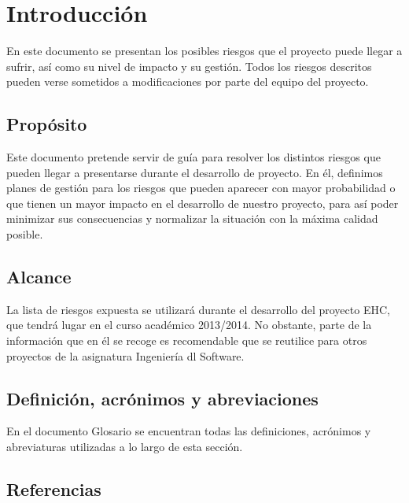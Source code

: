 \chapter{Introducción}
En este documento se presentan los posibles riesgos que el proyecto puede llegar a sufrir, así como su nivel de impacto y su gestión. Todos los riesgos descritos pueden verse sometidos a modificaciones por parte del equipo del proyecto.
\section{Propósito}
Este documento pretende servir de guía para resolver los distintos riesgos que pueden llegar a presentarse durante el desarrollo de proyecto. En él, definimos planes de gestión para los riesgos que pueden aparecer con mayor probabilidad o que tienen un mayor impacto en el desarrollo de nuestro proyecto, para así poder minimizar sus consecuencias y normalizar la situación con la máxima calidad posible.
\section{Alcance}
La lista de riesgos expuesta se utilizará durante el desarrollo del proyecto EHC, que tendrá lugar en el curso académico 2013/2014. No obstante, parte de la información que en él se recoge es recomendable que se reutilice para otros proyectos de la asignatura Ingeniería dl Software.
\section{Definición, acrónimos y abreviaciones}
En el documento Glosario se encuentran todas las definiciones, acrónimos y abreviaturas utilizadas a lo largo de esta sección.
\section{Referencias}
